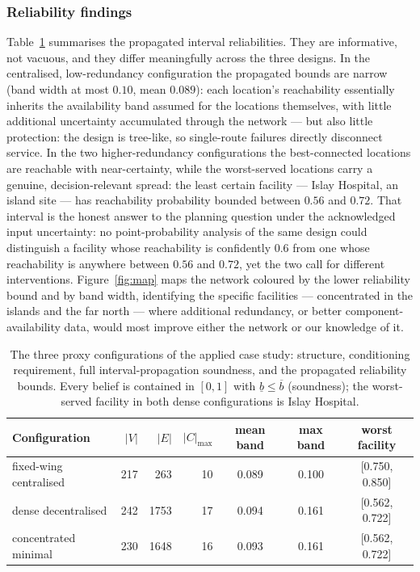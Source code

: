 \documentclass[preprint,12pt]{elsarticle}
\theoremstyle{definition}
\begin{document}
\subsubsection{Reliability findings}\label{sec:findings}

Table~\ref{tab:drone} summarises the propagated interval reliabilities. They are informative, not
vacuous, and they differ meaningfully across the three designs. In the centralised, low-redundancy
configuration the propagated bounds are narrow (band width at most $0.10$, mean $0.089$): each
location's reachability essentially inherits the availability band assumed for the locations themselves,
with little additional uncertainty accumulated through the network --- but also little protection: the
design is tree-like, so single-route failures directly disconnect service. In the two higher-redundancy
configurations the best-connected locations are reachable with near-certainty, while the worst-served
locations carry a genuine, decision-relevant spread: the least certain facility --- Islay Hospital, an
island site --- has reachability probability bounded between $0.56$ and $0.72$. That interval is the
honest answer to the planning question under the acknowledged input uncertainty: no point-probability
analysis of the same design could distinguish a facility whose reachability is confidently $0.6$ from
one whose reachability is anywhere between $0.56$ and $0.72$, yet the two call for different
interventions. Figure~\ref{fig:map} maps the network coloured by the lower reliability bound and by band
width, identifying the specific facilities --- concentrated in the islands and the far north --- where
additional redundancy, or better component-availability data, would most improve either the network or
our knowledge of it.

\begin{table}[t]
\centering\small
\caption{The three proxy configurations of the applied case study: structure, conditioning requirement,
full interval-propagation soundness, and the propagated reliability bounds. Every belief is contained in
$[0,1]$ with $\underline{b}\le\overline{b}$ (soundness); the worst-served facility in both dense
configurations is Islay Hospital.}
\label{tab:drone}
\begin{tabular}{lrrrccc}
\toprule
Configuration & $|V|$ & $|E|$ & $|C|_{\max}$ & mean band & max band & worst facility\\
\midrule
fixed-wing centralised & 217 & 263 & 10 & 0.089 & 0.100 & [0.750, 0.850]\\
dense decentralised & 242 & 1753 & 17 & 0.094 & 0.161 & [0.562, 0.722]\\
concentrated minimal & 230 & 1648 & 16 & 0.093 & 0.161 & [0.562, 0.722]\\
\bottomrule
\end{tabular}
\end{table}
\end{document}
